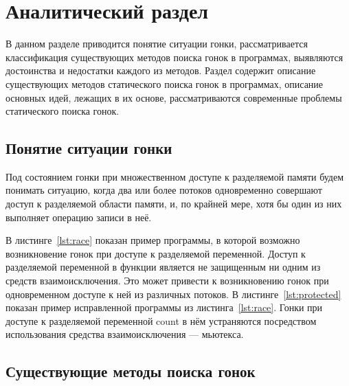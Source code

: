 \chapter{Аналитический раздел}
\label{cha:analysis}

В данном разделе приводится понятие ситуации гонки, рассматривается классификация существующих методов поиска гонок в программах, выявляются достоинства и недостатки каждого из методов. Раздел содержит описание существующих методов статического поиска гонок в программах, описание основных идей, лежащих в их основе, рассматриваются современные проблемы статического поиска гонок.

\section{Понятие ситуации гонки}

Под состоянием гонки при множественном доступе к разделяемой памяти будем понимать ситуацию, когда два или более потоков одновременно совершают доступ к разделяемой области памяти, и, по крайней мере, хотя бы один из них выполняет операцию записи в неё.

В листинге~\ref{lst:race} показан пример программы, в которой возможно возникновение гонок при доступе к разделяемой переменной. Доступ к разделяемой переменной в функции является не защищенным ни одним из средств взаимоисключения. Это может привести к возникновению гонок при одновременном доступе к ней из различных потоков. В листинге~\ref{lst:protected} показан пример исправленной программы из листинга~\ref{lst:race}. Гонки при доступе к разделяемой переменной count в нём устраняются посредством использования средства взаимоисключения — мьютекса.






\section{Существующие методы поиска гонок}

